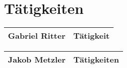 \chapter{Tätigkeiten}

\begin{tabular}{|c|c|}
	\hline
	Gabriel Ritter & Tätigkeit \\
	\hline
\end{tabular}

\begin{tabular}{|c|c|}
	\hline
	Jakob Metzler & Tätigkeiten \\
	\hline
\end{tabular}